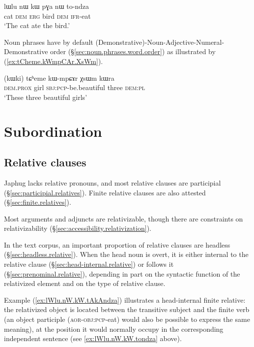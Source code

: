 \begin{exe}
\ex \label{ex:lWlu.nW.kW.tondza}
\gll lɯlu nɯ kɯ pɣa nɯ to-ndza \\
cat \textsc{dem} \textsc{erg} bird \textsc{dem} \textsc{ifr}-eat \\
\glt `The cat ate the bird.' 
\end{exe}

Noun phrases have by default (Demonstrative)-Noun-Adjective-Numeral-De\-mon\-strative order (§\ref{sec:noun.phrases.word.order}) as illustrated by (\ref{ex:tCheme.kWmpCAr.XsWm}).

\begin{exe}
\ex \label{ex:tCheme.kWmpCAr.XsWm}
\gll (kɯki) tɕʰeme kɯ-mpɕɤr χsɯm kɯra \\
\textsc{dem}.\textsc{prox} girl \textsc{sbj}:\textsc{pcp}-be.beautiful three \textsc{dem}:\textsc{pl} \\
\glt `These three beautiful girls'
\end{exe}


\section{Subordination} \label{sec:subordination.introduction}

\subsection{Relative clauses}
Japhug lacks relative pronouns, and most relative clauses are participial (§\ref{sec:participial.relatives}). Finite relative clauses are also attested (§\ref{sec:finite.relatives}).

Most arguments and adjuncts are relativizable, though there are constraints on relativizability (§\ref{sec:accessibility.relativization}).

In the text corpus, an important proportion of relative clauses are headless (§\ref{sec:headless.relative}). When the head noun is overt, it is either internal to the relative clause (§\ref{sec:head-internal.relative}) or follows it (§\ref{sec:prenominal.relative}), depending in part on the syntactic function of the relativized element and on the type of relative clause.

Example (\ref{ex:lWlu.nW.kW.tAkAndza}) illustrates a head-internal finite relative: the relativized object  is located between the transitive subject  and the finite verb (an object participle  (\textsc{aor}-\textsc{obj}:\textsc{pcp}-eat) would also be possible to express the same meaning), at the position it would normally occupy in the corresponding independent sentence (see \ref{ex:lWlu.nW.kW.tondza} above).

